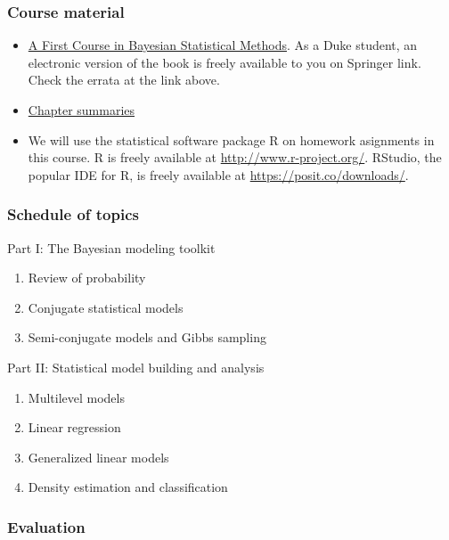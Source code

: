 \documentclass[
  letterpaper,
  DIV=11,
  numbers=noendperiod]{scrartcl}
\providecommand{\tightlist}{%
  \setlength{\itemsep}{0pt}\setlength{\parskip}{0pt}}\usepackage{longtable,booktabs,array}
\begin{document}
\hypertarget{course-material}{%
\subsubsection{Course material}\label{course-material}}

\begin{itemize}
\item
  \href{https://pdhoff.github.io/book/}{A First Course in Bayesian
  Statistical Methods}. As a Duke student, an electronic version of the
  book is freely available to you on Springer link. Check the errata at
  the link above.
\item
  \href{/chapterSummaries.html}{Chapter summaries}
\item
  We will use the statistical software package R on homework asignments
  in this course. R is freely available at
  \url{http://www.r-project.org/}. RStudio, the popular IDE for R, is
  freely available at \url{https://posit.co/downloads/}.
\end{itemize}

\hypertarget{schedule-of-topics}{%
\subsubsection{Schedule of topics}\label{schedule-of-topics}}

Part I: The Bayesian modeling toolkit

\begin{enumerate}
\def\labelenumi{\arabic{enumi}.}
\tightlist
\item
  Review of probability
\item
  Conjugate statistical models
\item
  Semi-conjugate models and Gibbs sampling
\end{enumerate}

Part II: Statistical model building and analysis

\begin{enumerate}
\def\labelenumi{\arabic{enumi}.}
\tightlist
\item
  Multilevel models
\item
  Linear regression
\item
  Generalized linear models
\item
  Density estimation and classification
\end{enumerate}

\hypertarget{evaluation}{%
\subsubsection{Evaluation}\label{evaluation}}
\end{document}
